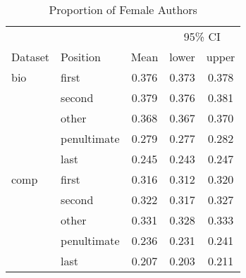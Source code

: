 \documentclass[10pt,letterpaper]{article}
\begin{document}
\begin{flushleft}
\begin{table}[]
\centering
\caption{Proportion of Female Authors}
\label{Table 1}
\begin{tabular}{llccc}
\toprule
        &               &       & \multicolumn{2}{c}{95\% CI} \\
\cmidrule(r){4-5}
Dataset & Position      & Mean  & lower        & upper        \\
\midrule
bio     & first         & 0.376 & 0.373        & 0.378        \\
        & second        & 0.379 & 0.376        & 0.381        \\
        & other         & 0.368 & 0.367        & 0.370        \\
        & penultimate   & 0.279 & 0.277        & 0.282        \\
        & last          & 0.245 & 0.243        & 0.247        \\
comp    & first         & 0.316 & 0.312        & 0.320        \\
        & second        & 0.322 & 0.317        & 0.327        \\
        & other         & 0.331 & 0.328        & 0.333        \\
        & penultimate   & 0.236 & 0.231        & 0.241        \\
        & last          & 0.207 & 0.203        & 0.211        \\
\bottomrule
\end{tabular}
\end{table}


\end{flushleft}
\end{document}
